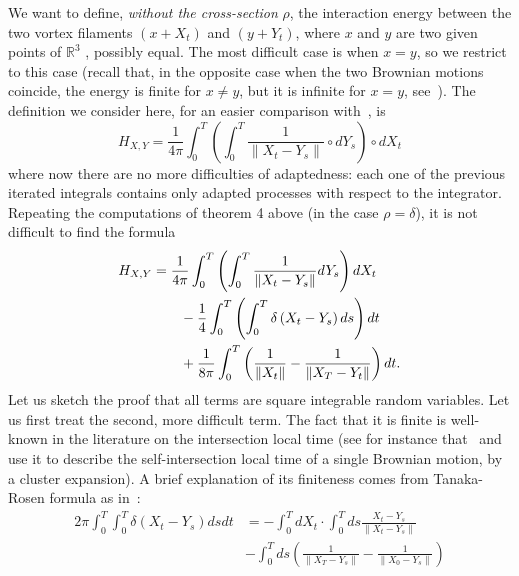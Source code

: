 We want to define, \textit{without the cross-section} $\rho $, the
interaction energy between the two vortex filaments $(x+X_{t})$ and $\left(
y+Y_{t}\right) $, where $x$ and $y$ are two given points of $\mathbb{R}^{3}$%
, possibly equal. The most difficult case is when $x=y$, so we restrict to
this case (recall that, in the opposite case when the two Brownian motions
coincide, the energy is finite for $x\neq y$, but it is infinite for $x=y$,
see~\cite{Fl2}). The definition we consider here, for an easier comparison
with~\cite{Fl2}, is
\begin{equation*}
H_{X,Y}=\frac{1}{4\pi} \int_{0}^{T}\left( \int_{0}^{T}\frac{1}{\left\| X_{t}-Y_{s}\right\| }%
\circ dY_{s}\right) \circ dX_{t}
\end{equation*}
where now there are no more difficulties of adaptedness: each one of the previous
iterated integrals contains only adapted processes with respect to the
integrator. Repeating the computations of theorem 4 above (in the case $\rho
=\delta $), it is not difficult to find the formula
\begin{equation}
\begin{split}
H_{X,Y} & = \frac{1}{4\pi}
\int_{0}^{T}\left( \int_{0}^{T}\frac{1}{\left\| X_{t}-Y_{s}\right\| }%
dY_{s}\right) dX_{t}
\\ & \qquad
- \frac{1}{4} \int_{0}^{T}\left( \int_{0}^{T}\delta \left(
X_{t}-Y_{s}\right) ds\right) dt
\\ & \qquad
+\frac{1}{8 \pi}\int_{0}^{T}\left( \frac{1}{\left\| X_{t}\right\| }-\frac{1}{%
\left\| X_{T}-Y_{t}\right\| }\right) dt. 
\end{split}
 \label{inter}
\end{equation}
Let us sketch the proof that all terms are square integrable random
variables. Let us first treat the second, more difficult term. The fact that
it is finite is well-known in the literature on the intersection local time
(see for instance that~\cite{We} and~\cite{LeG1} use it to
describe the self-intersection local time of a single Brownian motion, by a
cluster expansion). A brief explanation of its finiteness comes from
Tanaka-Rosen formula as in~\cite{Yo1}:
\begin{equation}
\begin{split}
2 \pi \int_{0}^{T} \int_{0}^{T} \delta\left(
X_{t}-Y_{s}\right) ds dt & =  - \int_{0}^{T} dX_t  \cdot \int_{0}^{T} ds \frac{X_t -
Y_s}{\| X_t - Y_s \|} 
\\ \qquad & - \int_{0}^{T} ds \left( \frac{1}{\| X_T - Y_s\|} - 
\frac{1}{\|X_0 - Y_s \|}
\right) 
\end{split}
\end{equation}
